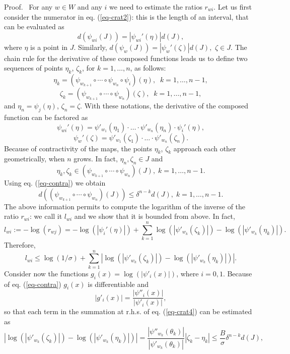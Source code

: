 \documentclass[final,epsfig,amsfont]{article}
\begin{document}
{\smallskip Proof.\ }
For any $w \in W$ and any $i$ we need to estimate the ratios $r_{wi}$.
Let us first consider the numerator in eq. (\ref{eq-crat2}): this is the length of an interval, that can be evaluated as
\[
d(\psi_{wi}(J)) = |\psi_{wi}'(\eta)| d(J),
\]
where $\eta$ is a point in $J$. Similarly,
$
d(\psi_{w}(J)) = |\psi_{w}'(\zeta)| d(J),
$
$\zeta \in J$. The chain rule for the derivative of these composed functions leads us to define two sequences of points $\eta_k$, $\zeta_k$, for $k=1,\ldots,n$, as follows:
\[
\eta_k = (\psi_{w_{k+1}} \circ \cdots \circ \psi_{w_n} \circ \psi_i) (\eta), \;\; k = 1,\ldots,n-1 ,
\]
\[
\zeta_k = (\psi_{w_{k+1}} \circ \cdots \circ \psi_{w_n}) (\zeta), \;\; k = 1,\ldots,n-1 ,
\]
and $\eta_n = \psi_j(\eta)$, $\zeta_n=\zeta$.
With these notations, the derivative of the composed function can be factored as
\[
\psi_{wi}'(\eta) = \psi'_{w_1} (\eta_1) \cdot \ldots \cdot \psi'_{w_n} (\eta_n) \cdot \psi_i'(\eta),
\]
\[
\psi_{w}'(\zeta) = \psi'_{w_1} (\zeta_1) \cdot \ldots \cdot \psi'_{w_n} (\zeta_n) .
\]
Because of contractivity of the maps, the points $\eta_k$, $\zeta_k$ approach each other geometrically, when $n$ grows. In fact, $\eta_n, \zeta_n \in J$ and
\[
  \eta_k, \zeta_k \in (\psi_{w_{k+1}} \circ \cdots \circ \psi_{w_n}) (J), \; k = 1,\ldots,n-1.
\]
Using eq. (\ref{eq-contra}) we obtain
\[
  d((\psi_{w_{k+1}} \circ \cdots \circ \psi_{w_n}) (J)) \leq \delta^{n-k} d(J), \; k = 1,\ldots,n-1.
\]
The above information permits to compute the logarithm of the inverse of the ratio $r_{wi}$: we call it $l_{wi}$ and we show that it is bounded from above. In fact,
\begin{equation}
l_{wi}:=-\log(r_{wj}) =
- \log(|\psi_i'(\eta)|) + \sum_{k=1}^n \log (|\psi'_{w_k} (\zeta_k)|) - \log (|\psi'_{w_k} (\eta_k)|).
\label{eq-crat3}
\end{equation}
Therefore,
\begin{equation}
l_{wi} \leq \log(1/\sigma)
+ \sum_{k=1}^n |\log (|\psi'_{w_k} (\zeta_k)|) - \log (|\psi'_{w_k} (\eta_k)|)|.
\label{eq-crat4}
\end{equation}
Consider now the functions $g_i(x) = \log(|\psi'_i(x)|)$, where $i=0,1$.
Because of  eq. (\ref{eq-contra}) $g_i(x)$ is differentiable and
\[
  |g'_i(x)| = \frac{|\psi''_i(x)|}{|\psi'_i(x)|},
\]
so that each term in the summation at r.h.s. of eq. (\ref{eq-crat4}) can be estimated as
\begin{equation}
 |\log (|\psi'_{w_k} (\zeta_k)|) - \log (|\psi'_{w_k} (\eta_k)|)| =  \frac{|\psi''_{w_k}(\theta_k)|}{|\psi'_{w_k}(\theta_k)|} |\zeta_k-\eta_k| \leq
 \frac{B}{\sigma} \delta^{n-k} d(J),
\label{eq-crat5}
\end{equation}
\end{document}
